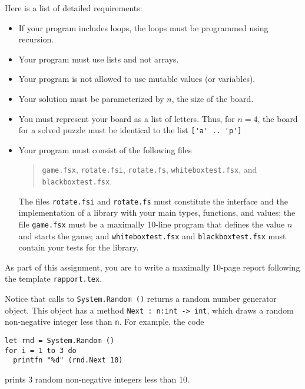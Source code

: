 Here is a list of detailed requirements:
\begin{itemize}
\item If your program includes loops, the loops must be programmed using recursion.
\item Your program must use lists and not arrays.
\item Your program is not allowed to use mutable values (or variables).
\item Your solution must be parameterized by $n$, the size of the board.
\item You must represent your board as a list of letters. Thus, for $n=4$, the board for a solved puzzle must be identical to the list \lstinline{['a' .. 'p']}
\item Your program must consist of the following files
\begin{quote}
\lstinline{game.fsx}, \lstinline{rotate.fsi}, \lstinline{rotate.fs}, \lstinline{whiteboxtest.fsx}, and \lstinline{blackboxtest.fsx}.
\end{quote}
The files \lstinline{rotate.fsi} and \lstinline{rotate.fs} must constitute the interface and the implementation of a library with your main types, functions, and values; the file \lstinline{game.fsx} must be a maximally 10-line program that defines the value $n$ and starts the game; and \lstinline{whiteboxtest.fsx} and \lstinline{blackboxtest.fsx} must contain your tests for the library.
\end{itemize}
As part of this assignment, you are to write a maximally 10-page report following the template \lstinline{rapport.tex}.

Notice that calls to \lstinline{System.Random ()} returns a random number generator object. This object has a method \lstinline{Next : n:int -> int}, which draws a random non-negative integer less than \lstinline{n}. For example, the code
\begin{lstlisting}
let rnd = System.Random ()
for i = 1 to 3 do
  printfn "%d" (rnd.Next 10)
\end{lstlisting}
prints 3 random non-negative integers less than 10.
